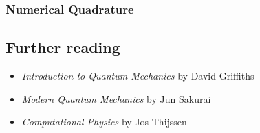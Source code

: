 \documentclass[prb,aps,11pt,superscriptaddress,floatfix]{revtex4-2}
\begin{document}
\subsubsection{Numerical Quadrature}





\subsection{Further reading}

\begin{itemize}
  \item \emph{Introduction to Quantum Mechanics} by David Griffiths
  \item \emph{Modern Quantum Mechanics} by Jun Sakurai
  \item \emph{Computational Physics} by Jos Thijssen
\end{itemize}




\end{document}
